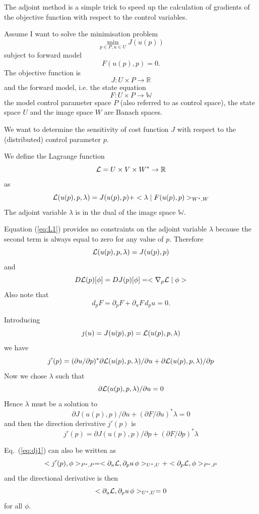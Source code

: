 \documentclass[10pt,a4paper]{book}
\newcommand{\p}{\partial}
\begin{document}
The adjoint method is a simple trick to speed up the calculation of
gradients of the objective function with respect to the control variables. 

Assume I want to solve the minimisation problem
\[
\min_{p \in P, u \in U } J(u(p)) 
\]
subject to forward model
\[     
F(u(p),p)=0.
\]
The objective function is
\[
J : U \times P \to \mathbb{R}
\]
and the forward model, i.e. the state equation
\[
F : U \times P \to \mathbb{W}
\]
the model control parameter space $P$ (also referred to as control space), the
state space $U$ and the image space $W$ are Banach spaces.



We want to determine the sensitivity of cost function $J$ with respect
to the (distributed) control parameter $p$. 



We define the Lagrange function 
\[
{\cal L}= U \times V \times W^\ast \to \mathbb{R} 
\]
as
\begin{equation} 
{\cal L}(u(p),p,\lambda)=J(u(p),p)+<\lambda \mid F(u(p),p) >_{W^\ast ,W}
\label{eq:L1}
\end{equation}
The adjoint variable $\lambda$ is in the dual of the image space $\mathbb{W}$.

Equation (\ref{eq:L1}) provides no constraints on the adjoint variable $\lambda$ because the
second term is always equal to zero for any value of $p$. 
Therefore
\[
{\cal L}(u(p),p,\lambda)=J(u(p),p)
\]
and
\[
D {\cal L}(p)[\phi] = D J(p)[\phi] =  <\nabla_p {\cal L}  \mid \phi >  
\]
Also note that 
\[
d_p F= \p_p F + \p_u F \, d_p u =0  .
\]


Introducing
\[
j(u)=J(u(p),p)= {\cal L}(u(p),p,\lambda)
\]
we have
\begin{equation}
j'(p)= (\p u / \p p )^\ast \p {\cal L}(u(p),p,\lambda)/\p u + \p {\cal L}(u(p),p,\lambda)/ \p p
\label{eq:dj1}
\end{equation}
Now we chose $\lambda$ such that 
\[
\p {\cal L}(u(p),p,\lambda)/ \p u=0
\]
Hence $\lambda$ must be a solution to
\[
\p J(u(p),p) / \p u + (\p F/\p u)^\ast \lambda=0
\]
and then the direction derivative $j'(p)$ is
\begin{equation}
j'(p)= \p J(u(p),p)/ \p p + (\p F / \p p)^\ast  \lambda
\label{eq:dder}
\end{equation}

Eq.~(\ref{eq:dj1}) can also be written as
\[
< j'(p), \phi>_{P^\ast, P}= < \p_u {\cal L} , \p_p u \,  \phi >_{U^\ast , U}  + < \p_p {\cal L} , \phi>_{P^\ast,P}  
\]
and the directional derivative is then 
\[
<\p_u {\cal L}, \p_p u \, \phi>_{U^\ast, U}=0
\]
for all $\phi$.
\end{document}
